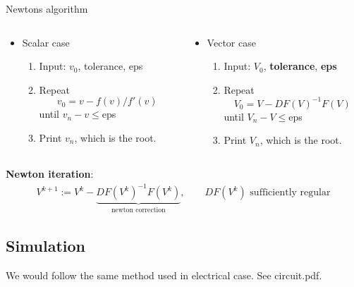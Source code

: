 \documentclass[xcolor=dvipsnames]{beamer}
\begin{document}
\begin{frame}{Newtons algorithm}

\begin{columns}
	\begin{column}{.55\textwidth}
		\begin{itemize}
		\item Scalar case
			\begin{enumerate}
				\item Input: $v_0$, tolerance, eps
				\item Repeat
				\[v_0 = v - f(v)/f'(v)\]
				until $v_n-v\le$eps
				\item Print $v_n$, which is the root.
			\end{enumerate}
		\end{itemize}
	\end{column}
	\begin{column}{.75\textwidth}
 		\begin{itemize}
		\item Vector case
			\begin{enumerate}
				\item Input: $V_0$, \textbf{tolerance}, \textbf{eps}
				\item Repeat
				\[V_0 = V - DF(V)^{-1} F(V)\]
				until $V_n-V\le$eps
				\item Print $V_n$, which is the root.
			\end{enumerate}
		\end{itemize}
    \end{column}
\end{columns}
\textbf{Newton iteration}:
\begin{align*}
 	V^{k+1}:= V^k - \underbrace{DF(V^k)^{-1}F(V^k)}_{\text{newton correction}},\qquad DF(V^k)\,\,\text{sufficiently regular}
 \end{align*} 

\end{frame}

\subsection{Simulation}

\begin{frame}
	We would follow the same method used in electrical case. See circuit.pdf.
\end{frame}
\end{document}
